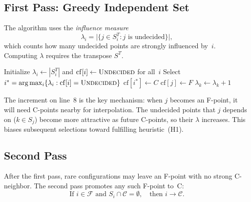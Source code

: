 \documentclass[11pt]{article}
\newcommand{\CC}{\mathcal{C}}
\newcommand{\FF}{\mathcal{F}}
\begin{document}
\subsection{First Pass: Greedy Independent Set}

The algorithm uses the \emph{influence measure}
\begin{equation}
  \label{eq:lambda}
  \lambda_i = \bigl|\{j \in S_i^T : j \text{ is undecided}\}\bigr|,
\end{equation}
which counts how many undecided points are strongly influenced by~$i$.
Computing $\lambda$ requires the transpose $S^T$.

\begin{algorithm}[H]
\caption{Classical RS Coarsening --- First Pass}
\label{alg:coarsen}
\begin{algorithmic}[1]
  \State Initialize $\lambda_i \gets |S_i^T|$ and $\mathrm{cf}[i]
    \gets \textsc{Undecided}$ for all~$i$
    \State Select $i^* = \arg\max_i \{\lambda_i : \mathrm{cf}[i] =
      \textsc{Undecided}\}$
    \State $\mathrm{cf}[i^*] \gets C$ \hfill
      \State $\mathrm{cf}[j] \gets F$ \hfill
        \State $\lambda_k \gets \lambda_k + 1$ \hfill
      \EndFor
    \EndFor
  \EndWhile
\end{algorithmic}
\end{algorithm}

The increment on line~8 is the key mechanism: when $j$ becomes an
F-point, it will need C-points nearby for interpolation.  The undecided
points that $j$ depends on ($k \in S_j$) become more attractive as
future C-points, so their $\lambda$ increases.  This biases subsequent
selections toward fulfilling heuristic~(H1).

\subsection{Second Pass}

After the first pass, rare configurations may leave an F-point with no
strong C-neighbor.  The second pass promotes any such F-point to~C:
\[
  \text{If } i \in \FF \text{ and } S_i \cap \CC = \emptyset,
  \quad\text{then } i \to \CC.
\]
\end{document}
